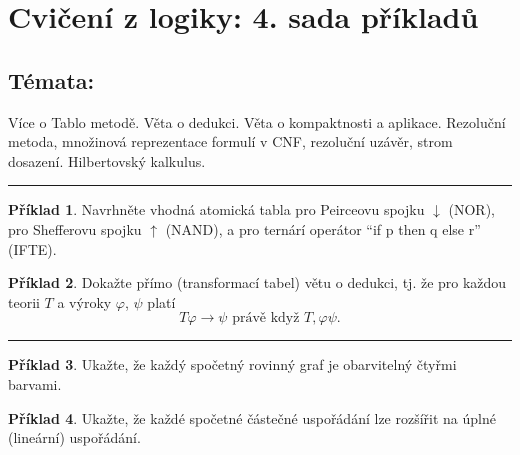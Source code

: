 \documentclass{amsart}
\theoremstyle{definition}
\newtheorem{problem}{Příklad}
\begin{document}
\section*{Cvičení z logiky: 4. sada příkladů}

\bigskip\bigskip\bigskip

\subsection*{Témata:} Více o Tablo metodě. Věta o dedukci. Věta o kompaktnosti a aplikace. Rezoluční metoda, množinová reprezentace formulí v CNF, rezoluční uzávěr, strom dosazení. Hilbertovský kalkulus.

\medskip\hrule

\begin{problem} Navrhněte vhodná atomická tabla pro Peirceovu spojku $\downarrow$ (NOR), pro Shefferovu spojku $\uparrow$ (NAND), a pro ternárí operátor ``if p then q else r'' (IFTE).
\end{problem}\medskip

\begin{problem}
Dokažte přímo (transformací tabel) větu o dedukci, tj. že pro každou teorii $T$ a výroky $\varphi$, $\psi$ platí
$$T  \varphi\to \psi\text{\ \ právě když\ \ }T,\varphi  \psi.$$
\end{problem}\medskip


\hrule

\begin{problem}
Ukažte, že každý spočetný rovinný graf je obarvitelný čtyřmi barvami.
\end{problem}\medskip

\begin{problem}
Ukažte, že každé spočetné částečné uspořádání lze rozšířit na úplné (lineární) uspořádání.
\end{problem}\medskip

\end{document}
